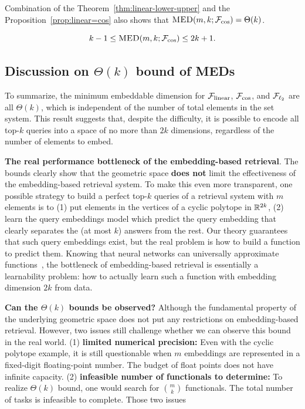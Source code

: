 Combination of the Theorem~\ref{thm:linear-lower-upper} and the Proposition~\ref{prop:linear=cos} also shows that $\textsc{MED}(m, k; \mathcal{F}_{\cos}) = \Theta(k)$.

\begin{theorem}\label{thm:cos-lower-upper}
    $$k-1\leq \textsc{MED}(m, k; \mathcal{F}_{\cos}) \leq 2k+1.$$
\end{theorem}

\subsection{Discussion on $\Theta(k)$ bound of MEDs}
To summarize, the minimum embeddable dimension for $\mathcal{F}_{\rm linear}$, $\mathcal{F}_{\cos}$, and $\mathcal{F}_{\ell_{2}}$ are all $\Theta(k)$, which is independent of the number of total elements in the set system. This result suggests that, despite the difficulty, it is possible to encode all top-$k$ queries into a space of no more than $2k$ dimensions, regardless of the number of elements to embed.

\noindent\textbf{The real performance bottleneck of the embedding-based retrieval}. The bounds clearly show that the geometric space \textbf{does not} limit the effectiveness of the embedding-based retrieval system. To make this even more transparent, one possible strategy to build a perfect top-$k$ queries of a retrieval system with $m$ elements is to (1) put elements in the vertices of a cyclic polytope in $\mathbb{R}^{2k}$, (2) learn the query embeddings model which predict the query embedding that clearly separates the (at most $k$) answers from the rest. Our theory guarantees that such query embeddings exist, but the real problem is how to build a function to predict them. Knowing that neural networks can universally approximate functions~\citep {hornik1989multilayer}, the bottleneck of embedding-based retrieval is essentially a learnability problem: how to actually learn such a function with embedding dimension $2k$ from data.

\noindent\textbf{Can the $\Theta(k)$ bounds be observed?} Although the fundamental property of the underlying geometric space does not put any restrictions on embedding-based retrieval. However, two issues still challenge whether we can observe this bound in the real world. (1) \textbf{limited numerical precision:} Even with the cyclic polytope example, it is still questionable when $m$ embeddings are represented in a fixed-digit floating-point number. The budget of float points does not have infinite capacity. (2) \textbf{infeasible number of functionals to determine:} To realize $\Theta(k)$ bound, one would search for $\binom{m}{k}$ functionals. The total number of tasks is infeasible to complete. Those two issues
